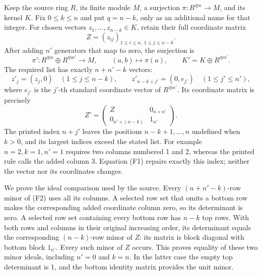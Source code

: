 \documentclass[11pt]{article}
\begin{document}
Keep the source ring \(R\), its finite module \(M\), a surjection \(\pi:R^{\oplus n}\to M\), and its kernel \(K\). Fix \(0\leq k\leq n\) and put \(q=n-k\), only as an additional name for that integer. For chosen vectors \(z_1,\ldots,z_{n-k}\in K\), retain their full coordinate matrix \[
 Z=(z_{ij})_{1\leq i\leq n,\ 1\leq j\leq n-k}.
\] After adding \(n'\) generators that map to zero, the surjection is \[
 \pi':R^{\oplus n}\oplus R^{\oplus n'}\longrightarrow M,
 \qquad (a,b)\longmapsto\pi(a),
 \qquad K'=K\oplus R^{\oplus n'}.
\] The required list has exactly \(n+n'-k\) vectors: \[
 z'_j=(z_j,0)\quad(1\leq j\leq n-k),\qquad
 z'_{n-k+j'}=(0,e_{j'})\quad(1\leq j'\leq n'),
\tag{F1}
\] where \(e_{j'}\) is the \(j'\)-th standard coordinate vector of \(R^{\oplus n'}\). Its coordinate matrix is precisely \[
 Z'=
 \begin{pmatrix}
  Z&0_{n\times n'}\\
  0_{n'\times(n-k)}&1_{n'}
 \end{pmatrix}.
\tag{F2}
\] The printed index \(n+j'\) leaves the positions \(n-k+1,\ldots,n\) undefined when \(k>0\), and its largest indices exceed the stated list. For example \(n=2,k=1,n'=1\) requires two columns numbered 1 and 2, whereas the printed rule calls the added column 3. Equation (F1) repairs exactly this index; neither the vector nor its coordinates changes.

We prove the ideal comparison used by the source. Every \((n+n'-k)\)-row minor of (F2) uses all its columns. A selected row set that omits a bottom row makes the corresponding added coordinate column zero, so its determinant is zero. A selected row set containing every bottom row has \(n-k\) top rows. With both rows and columns in their original increasing order, its determinant equals the corresponding \((n-k)\)-row minor of \(Z\): its matrix is block diagonal with bottom block \(1_{n'}\). Every such minor of \(Z\) occurs. This proves equality of these two minor ideals, including \(n'=0\) and \(k=n\). In the latter case the empty top determinant is 1, and the bottom identity matrix provides the unit minor.
\end{document}
